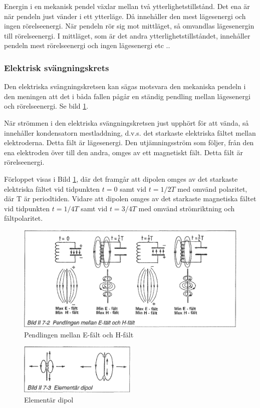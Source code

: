 Energin i en mekanisk pendel växlar mellan två
ytterlighetstillstånd. Det ena är när pendeln just vänder i ett
ytterläge. Då innehåller den mest lägesenergi och ingen
rörelseenergi. När pendeln rör sig mot mittläget, så omvandlas
lägesenergin till rörelseenergi. I mittläget, som är det andra
ytterlighetstillståndet, innehåller pendeln mest rörelseenergi och
ingen lägesenergi etc ..

\subsubsection{Elektrisk svängningskrets}

Den elektriska svängningskretsen kan sägas motsvara den mekaniska
pendeln i den meningen att det i båda fallen pågår en ständig pendling
mellan lägesenergi och rörelseenergi. Se bild \ref{fig:BildII7-02}.

När strömmen i den elektriska svängningskretsen just upphört för att
vända, så innehåller kondensatorn mestladdning, d.v.s.  det starkaste
elektriska fältet mellan elektroderna. Detta fält är lägesenergi. Den
utjämningsström som följer, från den ena elektroden över till den
andra, omges av ett magnetiskt fält. Detta fält är rörelseenergi.

Förloppet visas i Bild \ref{fig:BildII7-02}, där det framgår att dipolen omges av
det starkaste elektriska fältet vid tidpunkten \(t=0\) samt vid
\(t=1/2T\) med omvänd polaritet, där T är periodtiden. Vidare att
dipolen omges av det starkaste magnetiska fältet vid tidpunkten
\(t=1/4T\) samt vid \(t=3/4T\) med omvänd strömriktning och
fältpolaritet.

\begin{figure}
\includegraphics[width=\textwidth]{images/bild_2_7-02}
\caption{Pendlingen mellan E-fält och H-fält}
\label{fig:BildII7-02}
\end{figure}

\begin{figure}
\includegraphics[width=0.5\textwidth]{images/bild_2_7-03}
\caption{Elementär dipol}
\label{fig:BildII7-03}
\end{figure}

